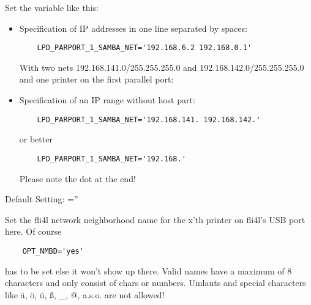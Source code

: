 \begin{description}
    Set the variable like this:

\begin{itemize}
\item Specification of IP addresses in one line separated by spaces:

\begin{example}
\begin{verbatim}
    LPD_PARPORT_1_SAMBA_NET='192.168.6.2 192.168.0.1'
\end{verbatim}
\end{example}

    With two nets 192.168.141.0/255.255.255.0 and
    192.168.142.0/255.255.255.0 and one printer on the first parallel port:

\item  Specification of an IP range without host part:

\begin{example}
\begin{verbatim}
    LPD_PARPORT_1_SAMBA_NET='192.168.141. 192.168.142.'
\end{verbatim}
\end{example}

    or better

\begin{example}
\begin{verbatim}
    LPD_PARPORT_1_SAMBA_NET='192.168.'
\end{verbatim}
\end{example}

    Please note the dot at the end!
\end{itemize}

    Default Setting: =''



    Set the fli4l network neighborhood name for the x'th printer on fli4l's USB port here.
    Of course

\begin{example}
\begin{verbatim}
    OPT_NMBD='yes'
\end{verbatim}
\end{example}

    has to be set else it won't show up there. Valid names have a maximum of 8 characters
    and only consist of chars or numbers. Umlauts and special characters like ä, ö, ü,
    ß, \_, @, a.s.o. are not allowed!


\end{description}
